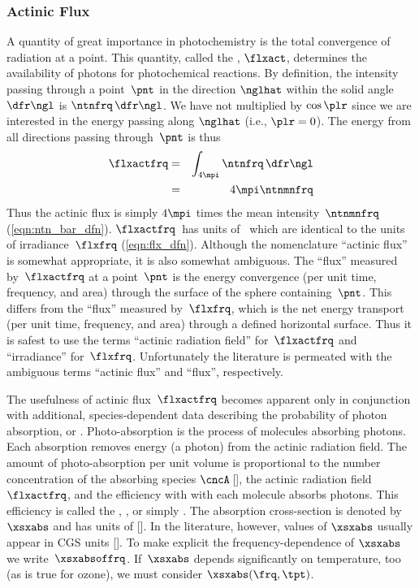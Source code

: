 \documentclass[12pt]{article}
\begin{document}
\subsubsection[Actinic Flux]{Actinic Flux}\label{sxn:flx_act}
A quantity of great importance in photochemistry is the total
convergence of radiation at a point.
This quantity, called the , $\flxact$, determines
the availability of photons for photochemical reactions. 
By definition, the intensity passing through a point~$\pnt$ in the
direction $\nglhat$ within the solid angle $\dfr\ngl$ is 
$\ntnfrq\,\dfr\ngl$. 
We have not multiplied by $\cos \plr$ since we are interested in the
energy passing along $\nglhat$ (i.e., $\plr = 0$). 
The energy from all directions passing through~$\pnt$ is thus
\begin{eqnarray}
\flxactfrq & = & \int_{4\mpi} \ntnfrq \,\dfr\ngl \nonumber \\
& = & 4\mpi \ntnmnfrq
\label{eqn:flx_act_dfn}
\end{eqnarray}
Thus the actinic flux is simply $4\mpi$ times the mean
intensity~$\ntnmnfrq$ (\ref{eqn:ntn_bar_dfn}). 
$\flxactfrq$~has units of \wxmShz\ which are identical to the units of
irradiance~$\flxfrq$ (\ref{eqn:flx_dfn}). 
Although the nomenclature ``actinic flux'' is somewhat appropriate, it
is also somewhat ambiguous.
The ``flux'' measured by~$\flxactfrq$ at a point~$\pnt$ is the energy
convergence (per unit time, frequency, and area) through the surface
of the sphere containing~$\pnt$.  
This differs from the ``flux'' measured by~$\flxfrq$, which is the net
energy transport (per unit time, frequency, and area) through a
defined horizontal surface. 
Thus it is safest to use the terms ``actinic radiation field''
for~$\flxactfrq$ and ``irradiance'' for~$\flxfrq$. 
Unfortunately the literature is permeated with the ambiguous terms
``actinic flux'' and ``flux'', respectively.

The usefulness of actinic flux~$\flxactfrq$ becomes apparent only in
conjunction with additional, species-dependent data describing the
probability of photon absorption, or .
Photo-absorption is the process of molecules absorbing photons.
Each absorption removes energy (a photon) from the actinic radiation field.
The amount of photo-absorption per unit volume is proportional to the
number concentration of the absorbing species $\cncA$\,[\xmC], the
actinic radiation field~$\flxactfrq$, and the efficiency with with
each molecule absorbs photons.
This efficiency is called the ,
, or simply .
The absorption cross-section is denoted by $\xsxabs$ and has units of 
[\xmS].
In the literature, however, values of $\xsxabs$ usually appear in CGS
units [\xcmS].
To make explicit the frequency-dependence of $\xsxabs$ we
write~$\xsxabsoffrq$.  
If~$\xsxabs$ depends significantly on temperature, too (as is true for 
ozone), we must consider $\xsxabs(\frq,\tpt)$.
\end{document}
